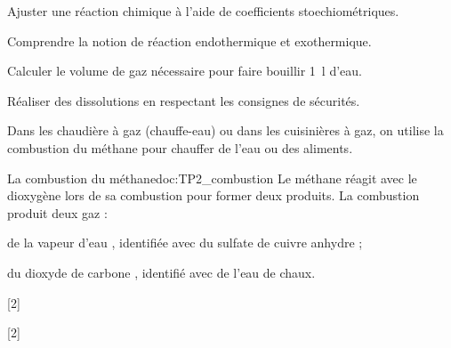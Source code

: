 \teteSndChim


\begin{objectifs}
  \item Ajuster une réaction chimique à l'aide de coefficients stoechiométriques.
  \item Comprendre la notion de réaction endothermique et exothermique. 
  \item Calculer le volume de gaz nécessaire pour faire bouillir \qty{1}{\litre} d'eau.
  \item Réaliser des dissolutions en respectant les consignes de sécurités.
\end{objectifs}

\begin{contexte}
  Dans les chaudière à gaz (chauffe-eau) ou dans les cuisinières à gaz, on utilise la combustion du méthane pour chauffer de l'eau ou des aliments.
  
\end{contexte}


\begin{doc}{La combustion du méthane}{doc:TP2_combustion}
  Le méthane \methane réagit avec le dioxygène \dioxygene lors de sa combustion pour former deux produits.
  La combustion produit deux gaz :
  \begin{listePoints}
    \item de la vapeur d'eau , identifiée avec du sulfate de cuivre anhydre ;
    \item du dioxyde de carbone \dioxydeDeCarbone, identifié avec de l'eau de chaux.
  \end{listePoints}
\end{doc}


[2]

[2]

